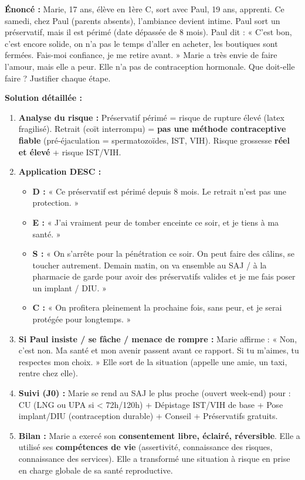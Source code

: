 \documentclass[11pt]{article}
\begin{document}
\begin{exoresolu}
\textbf{Énoncé :} Marie, 17 ans, élève en 1ère C, sort avec Paul, 19 ans, apprenti. Ce samedi, chez Paul (parents absents), l'ambiance devient intime. Paul sort un préservatif, mais il est périmé (date dépassée de 8 mois). Paul dit : « C'est bon, c'est encore solide, on n'a pas le temps d'aller en acheter, les boutiques sont fermées. Fais-moi confiance, je me retire avant. » Marie a très envie de faire l'amour, mais elle a peur. Elle n'a pas de contraception hormonale. Que doit-elle faire ? Justifier chaque étape.

\textbf{Solution détaillée :}
\begin{enumerate}
    \item \textbf{Analyse du risque :} Préservatif périmé = risque de rupture élevé (latex fragilisé). Retrait (coït interrompu) = \textbf{pas une méthode contraceptive fiable} (pré-éjaculation = spermatozoïdes, IST, VIH). Risque grossesse \textbf{réel et élevé} + risque IST/VIH.
    \item \textbf{Application DESC :}
    \begin{itemize}
        \item \textbf{D :} « Ce préservatif est périmé depuis 8 mois. Le retrait n'est pas une protection. »
        \item \textbf{E :} « J'ai vraiment peur de tomber enceinte ce soir, et je tiens à ma santé. »
        \item \textbf{S :} « On s'arrête pour la pénétration ce soir. On peut faire des câlins, se toucher autrement. Demain matin, on va ensemble au SAJ / à la pharmacie de garde pour avoir des préservatifs valides et je me fais poser un implant / DIU. »
        \item \textbf{C :} « On profitera pleinement la prochaine fois, sans peur, et je serai protégée pour longtemps. »
    \end{itemize}
    \item \textbf{Si Paul insiste / se fâche / menace de rompre :} Marie affirme : « Non, c'est non. Ma santé et mon avenir passent avant ce rapport. Si tu m'aimes, tu respectes mon choix. » Elle sort de la situation (appelle une amie, un taxi, rentre chez elle).
    \item \textbf{Suivi (J0) :} Marie se rend au SAJ le plus proche (ouvert week-end) pour : CU (LNG ou UPA si < 72h/120h) + Dépistage IST/VIH de base + Pose implant/DIU (contraception durable) + Conseil + Préservatifs gratuits.
    \item \textbf{Bilan :} Marie a exercé son \textbf{consentement libre, éclairé, réversible}. Elle a utilisé ses \textbf{compétences de vie} (assertivité, connaissance des risques, connaissance des services). Elle a transformé une situation à risque en prise en charge globale de sa santé reproductive.
\end{enumerate}
\end{exoresolu}
\end{document}
